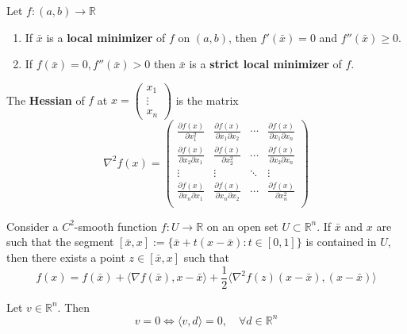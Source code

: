 \begin{corollary}
    Let $f: (a,b) \rightarrow \mathbb R$
    \begin{enumerate}
        \item If $\bar x$ is a \textbf{local minimizer} of $f$ on $(a,b)$, then $f'(\bar x) = 0$ and $f''(\bar x) \geq 0$.
        \item If $f(\bar x) = 0, f''(\bar x) > 0$ then $\bar x$ is a \textbf{strict local minimizer} of $f$.
    \end{enumerate}
\end{corollary}
\begin{definition}[Hessian]
    The \textbf{Hessian} of $f$ at $x = \begin{pmatrix}
        x_1 \\ \vdots \\ x_n
    \end{pmatrix}$ is the matrix
    $$\nabla^2 f(x) = \begin{pmatrix}
        \frac{\partial f(x)}{\partial x^2_1} & \frac{\partial f(x)}{\partial x_1 \partial x_2} & \cdots & \frac{\partial f(x)}{\partial x_1 \partial x_n} \\
        \frac{\partial f(x)}{\partial x_2 \partial x_1} & \frac{\partial f(x)}{\partial x_2^2} & \cdots & \frac{\partial f(x)}{\partial x_2 \partial x_n} \\
        \vdots & \vdots & \ddots & \vdots \\
        \frac{\partial f(x)}{\partial x_n \partial x_1} & \frac{\partial f(x)}{\partial x_n \partial x_2} & \cdots & \frac{\partial f(x)}{\partial x_n^2} \\
    \end{pmatrix}$$
\end{definition}
\begin{theorem}
    Consider a $C^2$-smooth function $f: U \rightarrow \mathbb R$ on an open set $U \subset \mathbb R^n$. If $\bar x$ and $x$ are such that the segment $[\bar x, x] := \{\bar x + t(x - \bar x): t \in [0,1]\}$ is contained in $U$, then there exists a point $z \in [\bar x, x]$ such that
    $$f(x) = f(\bar x) + \langle \nabla f(\bar x), x - \bar x \rangle + \frac{1}{2} \langle \nabla^2 f(z) (x - \bar x), (x - \bar x) \rangle$$
\end{theorem}
\begin{lemma}
    Let $v \in \mathbb R^n$. Then $$v = 0 \iff \langle v,d \rangle = 0, \quad \forall d \in \mathbb R^n$$
\end{lemma}

% 